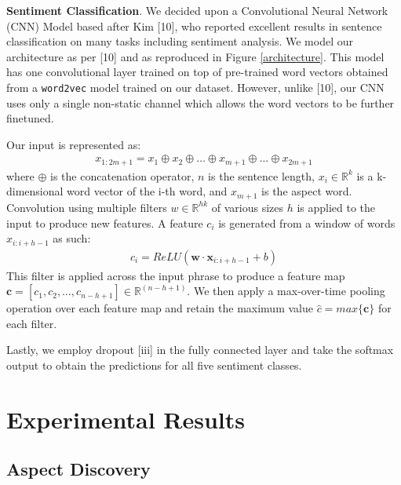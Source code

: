 \documentclass{article} %
\begin{document}
\textbf{Sentiment Classification}. We decided upon a Convolutional Neural Network (CNN) Model based after Kim [10], who reported excellent results in sentence classification on many tasks including sentiment analysis. We model our architecture as per [10] and as reproduced in Figure \ref{architecture}. This model has one convolutional layer trained on top of pre-trained word vectors obtained from a \texttt{word2vec} model trained on our dataset. However, unlike [10], our CNN uses only a single non-static channel which allows the word vectors to be further finetuned.

Our input is represented as:
\begin{align}
	x_{1:2m+1} = x_1 \oplus x_2 \oplus \ldots \oplus x_{m+1} \oplus \ldots \oplus x_{2m+1}
\end{align}
where $\oplus$ is the concatenation operator, $n$ is the sentence length, $x_i \in \mathbb{R}^k$ is a k-dimensional word vector of the i-th word, and $x_{m+1}$ is the aspect word. Convolution using multiple filters $w \in \mathbb{R}^{hk}$ of various sizes $h$ is applied to the input to produce new features. A feature $c_i$ is generated from a window of words $x_{i:i+h-1}$ as such:
\begin{align}
c_i = ReLU(\textbf{w} \cdot \textbf{x}_{i:i+h-1} + b)
\end{align}
This filter is applied across the input phrase to produce a feature map $\textbf{c} = [c_1, c_2, \ldots, c_{n-h+1}] \in \mathbb{R}^(n-h+1)$. We then apply a max-over-time pooling operation over each feature map and retain the maximum value $\hat{c} = max \{\textbf{c}\}$ for each filter.

Lastly, we employ dropout [iii] in the fully connected layer and take the softmax output to obtain the predictions for all five sentiment classes.


\section{Experimental Results} 

\subsection{Aspect Discovery} 
\end{document}
